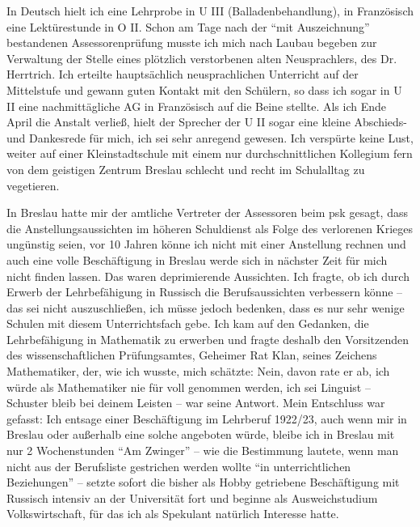 \documentclass[a5paper,pagesize,10pt,twoside=true]{scrbook}
\renewcommand{\marginpar}[2][]{}
\begin{document}
In Deutsch hielt ich eine Lehrprobe in U III (Balladenbehandlung), in Französisch eine Lektürestunde in O II. Schon am Tage nach der \enquote{mit Auszeichnung} bestandenen Assessorenprüfung musste ich mich nach Laubau begeben zur Verwaltung der Stelle eines plötzlich verstorbenen alten Neusprachlers, des Dr. Herrtrich. Ich erteilte hauptsächlich neusprachlichen Unterricht auf der Mittelstufe und gewann guten Kontakt mit den Schülern, so dass ich sogar in U II eine nachmittägliche AG in Französisch auf die Beine stellte. Als ich Ende April die Anstalt verließ, hielt der Sprecher der U II sogar eine kleine Abschieds- und Dankesrede für mich, ich sei sehr anregend gewesen. Ich verspürte keine Lust, weiter auf einer Kleinstadtschule mit einem nur durchschnittlichen Kollegium fern von dem geistigen Zentrum Breslau schlecht und recht im Schulalltag zu vegetieren.

In Breslau hatte mir der amtliche Vertreter der Assessoren beim \ac{psk} gesagt, dass die Anstellungsaussichten im höheren Schuldienst als Folge des verlorenen Krieges ungünstig seien, vor 10 Jahren könne ich nicht mit einer Anstellung rechnen und auch eine volle Beschäftigung in Breslau werde sich in nächster Zeit für mich nicht finden lassen. \marginpar{426} Das waren deprimierende Aussichten. Ich fragte, ob ich durch Erwerb der Lehrbefähigung in Russisch die Berufsaussichten verbessern könne -- das sei nicht auszuschließen, ich müsse jedoch bedenken, dass es nur sehr wenige Schulen mit diesem Unterrichtsfach gebe. Ich kam auf den Gedanken, die Lehrbefähigung in Mathematik zu erwerben und fragte deshalb den Vorsitzenden des wissenschaftlichen Prüfungsamtes, Geheimer Rat Klan, seines Zeichens Mathematiker, der, wie ich wusste, mich schätzte: Nein, davon rate er ab, ich würde als Mathematiker nie für voll genommen werden, ich sei Linguist -- Schuster bleib bei deinem Leisten -- war seine Antwort. Mein Entschluss war gefasst: Ich entsage einer Beschäftigung im Lehrberuf 1922/23, auch wenn mir in Breslau oder außerhalb eine solche angeboten würde, bleibe ich in Breslau mit nur 2 Wochenstunden \enquote{Am Zwinger} -- wie die Bestimmung lautete, wenn man nicht aus der Berufsliste gestrichen werden wollte \enquote{in unterrichtlichen Beziehungen} -- setzte sofort die bisher als Hobby getriebene Beschäftigung mit Russisch intensiv an der Universität fort und beginne als Ausweichstudium Volkswirtschaft, für das ich als Spekulant natürlich Interesse hatte.
\end{document}
